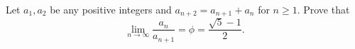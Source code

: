 Let $a_1,a_2$ be any positive integers and $a_{n+2}=a_{n+1}+a_n$ for $n\ge1$. Prove that
\[\lim_{n\to\infty}\dfrac{a_n}{a_{n+1}}=\phi=\dfrac{\sqrt5-1}{2}.\]
